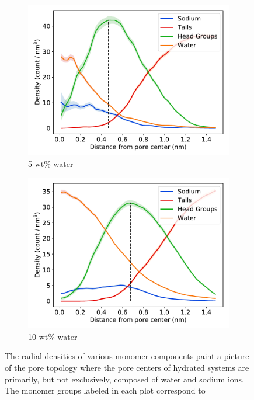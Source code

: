 \documentclass[journal=jpcbfk,manuscript=article]{achemso}
\begin{document}
\begin{figure}[!htb]
\begin{subfigure}{0.45\textwidth}
  \includegraphics[width=\textwidth]{component_density_5wt.pdf}
  \caption{5 wt\% water}\label{fig:component_density_5wt}
  \end{subfigure}
  \begin{subfigure}{0.45\textwidth}
  \includegraphics[width=\textwidth]{component_density_10wt.pdf}
  \caption{10 wt\% water}\label{fig:component_density_10wt}
  \end{subfigure}
  \caption{The radial densities of various monomer components paint a 
  picture of the pore topology where the pore centers of hydrated systems are primarily,
  but not exclusively, composed of water and sodium ions. The monomer groups labeled in each plot correspond to 
}
\end{figure}
\end{document}
